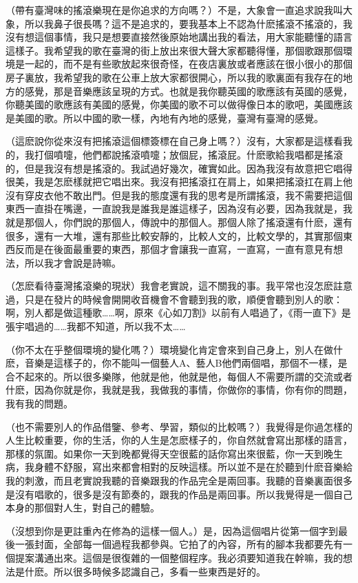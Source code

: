 \documentclass[UTF8,a4paper,oneside,twocolumn,12pt]{ctexbook}
\begin{document}
（帶有臺灣味的搖滾樂現在是你追求的方向嗎？）不是，大象會一直追求說我叫大象，所以我鼻子很長嗎？這不是追求的，要我基本上不認為什麽搖滾不搖滾的，我沒有想這個事情，我只是想要直接然後原始地講出我的看法，用大家能聽懂的語言這樣子。我希望我的歌在臺灣的街上放出來很大聲大家都聽得懂，那個歌跟那個環境是一起的，而不是有些歌放起來很奇怪，在夜店裏放或者應該在很小很小的那個房子裏放，我希望我的歌在公車上放大家都很開心，所以我的歌裏面有我存在的地方的感覺，那是音樂應該呈現的方式。也就是我你聽英國的歌應該有英國的感覺，你聽美國的歌應該有美國的感覺，你美國的歌不可以做得像日本的歌吧，美國應該是美國的歌。所以中國的歌一樣，內地有內地的感覺，臺灣有臺灣的感覺。

（這麽說你從來沒有把搖滾這個標簽標在自己身上嗎？）沒有，大家都是這樣看我的，我打個噴嚏，他們都說搖滾噴嚏；放個屁，搖滾屁。什麽歌給我唱都是搖滾的，但是我沒有想是搖滾的。我試過好幾次，確實如此。因為我沒有故意把它唱得很美，我是怎麽樣就把它唱出來。我沒有把搖滾扛在肩上，如果把搖滾扛在肩上他沒有穿皮衣他不敢出門。但是我的態度還有我的思考是所謂搖滾，我不需要把這個東西一直掛在嘴邊，一直說我是誰我是誰這樣子，因為沒有必要，因為我就是，我就是那個人，你們說的那個人，傳說中的那個人。那個人除了搖滾還有什麽，還有很多，還有一大堆，還有那些比較安靜的，比較人文的，比較文學的，其實那個東西反而是在後面最重要的東西，那個才會讓我一直寫，一直寫，一直有意見有想法，所以我才會說是詩嘛。

（怎麽看待臺灣搖滾樂的現狀）我會老實說，這不關我的事。我平常也沒怎麽註意過，只是在發片的時候會開開收音機會不會聽到我的歌，順便會聽到別人的歌：啊，別人都是做這種歌……啊，原來《心如刀割》以前有人唱過了，《雨一直下》是張宇唱過的……我都不知道，所以我不太……

（你不太在乎整個環境的變化嗎？）環境變化肯定會來到自己身上，別人在做什麽，音樂是這樣子的，你不能叫一個藝人A、藝人B他們兩個唱，那個不一樣，是合不起來的。所以很多樂隊，他就是他，他就是他，每個人不需要所謂的交流或者什麽，因為你就是你，我就是我，我做我的事情，你做你的事情，你有你的問題，我有我的問題。

（也不需要別人的作品借鑒、參考、學習，類似的比較嗎？）我覺得是你過怎樣的人生比較重要，你的生活，你的人生是怎麽樣子的，你自然就會寫出那樣的語言，那樣的氛圍。如果你一天到晚都覺得天空很藍的話你寫出來很藍，你一天到晚生病，我身體不舒服，寫出來都會相對的反映這樣。所以並不是在於聽到什麽音樂給我的刺激，而且老實說我聽的音樂跟我的作品完全是兩回事。我聽的音樂裏面很多是沒有唱歌的，很多是沒有節奏的，跟我的作品是兩回事。所以我覺得是一個自己本身的那個對人生，對自己的體驗。

（沒想到你是更註重內在修為的這樣一個人。）是，因為這個唱片從第一個字到最後一張封面，全部每一個過程我都參與。它拍了的內容，所有的腳本我都要先有一個提案溝通出來。這個是很復雜的一個整個程序。我必須要知道我在幹嘛，我的想法是什麽。所以很多時候多認識自己，多看一些東西是好的。
\end{document}
